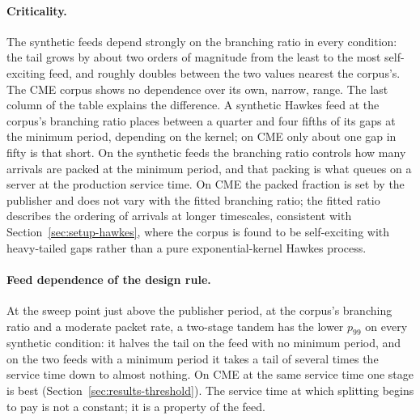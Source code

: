 \documentclass[11pt]{article}
\begin{document}
\paragraph{Criticality.} The synthetic feeds depend strongly on the branching ratio in
every condition: the tail grows by about two orders of magnitude from the least to the
most self-exciting feed, and roughly doubles between the two values nearest the corpus's.
The CME corpus shows no dependence over its own, narrow, range. The last column of the
table explains the difference. A synthetic Hawkes feed at the corpus's branching ratio
places between a quarter and four fifths of its gaps at the minimum period, depending on
the kernel; on CME only about one gap in fifty is that short. On the synthetic feeds the
branching ratio controls how many arrivals are packed at the minimum period, and that
packing is what queues on a server at the production service time. On CME the packed
fraction is set by the publisher and does not vary with the fitted branching ratio; the
fitted ratio describes the ordering of arrivals at longer timescales, consistent with
Section~\ref{sec:setup-hawkes}, where the corpus is found to be self-exciting with
heavy-tailed gaps rather than a pure exponential-kernel Hawkes process.

\paragraph{Feed dependence of the design rule.} At the sweep point just above the
publisher period, at the corpus's branching ratio and a moderate packet rate, a two-stage
tandem has the lower $p_{99}$ on every synthetic condition: it halves the tail on the feed
with no minimum period, and on the two feeds with a minimum period it takes a tail of
several times the service time down to almost nothing. On CME at the same service time
one stage is best (Section~\ref{sec:results-threshold}). The service time at which
splitting begins to pay is not a constant; it is a property of the feed.
\end{document}
